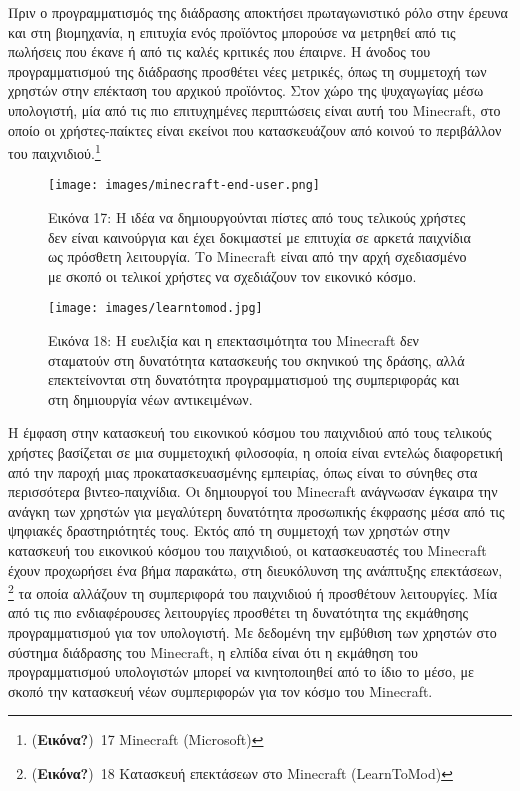 \documentclass[
]{article}
\begin{document}
Πριν ο προγραμματισμός της διάδρασης αποκτήσει πρωταγωνιστικό ρόλο στην
έρευνα και στη βιομηχανία, η επιτυχία ενός προϊόντος μπορούσε να
μετρηθεί από τις πωλήσεις που έκανε ή από τις καλές κριτικές που
έπαιρνε. Η άνοδος του προγραμματισμού της διάδρασης προσθέτει νέες
μετρικές, όπως τη συμμετοχή των χρηστών στην επέκταση του αρχικού
προϊόντος. Στον χώρο της ψυχαγωγίας μέσω υπολογιστή, μία από τις πιο
επιτυχημένες περιπτώσεις είναι αυτή του Minecraft, στο οποίο οι
χρήστες-παίκτες είναι εκείνοι που κατασκευάζουν από κοινού το περιβάλλον
του παιχνιδιού.\footnote{(\textbf{Εικόνα?})~17 Minecraft (Microsoft)}

\leavevmode{}%
\begin{figure}
\hypertarget{fig:minecraft-end-user}{%
\centering
\texttt{[image: images/minecraft-end-user.png]}
\caption{Εικόνα 17: Η ιδέα να δημιουργούνται πίστες από τους τελικούς
χρήστες δεν είναι καινούργια και έχει δοκιμαστεί με επιτυχία σε αρκετά
παιχνίδια ως πρόσθετη λειτουργία. Το Minecraft είναι από την αρχή
σχεδιασμένο με σκοπό οι τελικοί χρήστες να σχεδιάζουν τον εικονικό
κόσμο.}\label{fig:minecraft-end-user}
}
\end{figure}

\leavevmode{}%
\begin{figure}
\hypertarget{fig:learntomod}{%
\centering
\texttt{[image: images/learntomod.jpg]}
\caption{Εικόνα 18: Η ευελιξία και η επεκτασιμότητα του Minecraft δεν
σταματούν στη δυνατότητα κατασκευής του σκηνικού της δράσης, αλλά
επεκτείνονται στη δυνατότητα προγραμματισμού της συμπεριφοράς και στη
δημιουργία νέων αντικειμένων.}\label{fig:learntomod}
}
\end{figure}

Η έμφαση στην κατασκευή του εικονικού κόσμου του παιχνιδιού από τους
τελικούς χρήστες βασίζεται σε μια συμμετοχική φιλοσοφία, η οποία είναι
εντελώς διαφορετική από την παροχή μιας προκατασκευασμένης εμπειρίας,
όπως είναι το σύνηθες στα περισσότερα βιντεο-παιχνίδια. Οι δημιουργοί
του Minecraft ανάγνωσαν έγκαιρα την ανάγκη των χρηστών για μεγαλύτερη
δυνατότητα προσωπικής έκφρασης μέσα από τις ψηφιακές δραστηριότητές
τους. Εκτός από τη συμμετοχή των χρηστών στην κατασκευή του εικονικού
κόσμου του παιχνιδιού, οι κατασκευαστές του Minecraft έχουν προχωρήσει
ένα βήμα παρακάτω, στη διευκόλυνση της ανάπτυξης επεκτάσεων, \footnote{(\textbf{Εικόνα?})~18
  Κατασκευή επεκτάσεων στο Minecraft (LearnToMod)} τα οποία αλλάζουν τη
συμπεριφορά του παιχνιδιού ή προσθέτουν λειτουργίες. Μία από τις πιο
ενδιαφέρουσες λειτουργίες προσθέτει τη δυνατότητα της εκμάθησης
προγραμματισμού για τον υπολογιστή. Με δεδομένη την εμβύθιση των χρηστών
στο σύστημα διάδρασης του Minecraft, η ελπίδα είναι ότι η εκμάθηση του
προγραμματισμού υπολογιστών μπορεί να κινητοποιηθεί από το ίδιο το μέσο,
με σκοπό την κατασκευή νέων συμπεριφορών για τον κόσμο του Minecraft.
\end{document}
